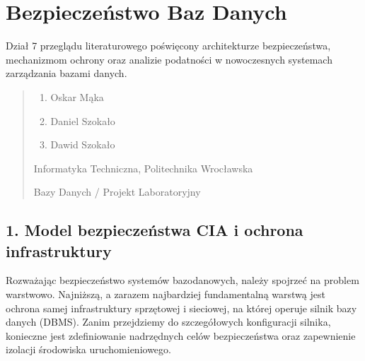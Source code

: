\documentclass[a4paper,11pt,english,openany,oneside]{sphinxmanual}
\begin{document}
\section{Bezpieczeństwo Baz Danych}
\label{\detokenize{rozdzial_2/rozdzial_27/index:bezpieczenstwo-baz-danych}}\label{\detokenize{rozdzial_2/rozdzial_27/index::doc}}
\sphinxAtStartPar
Dział 7 przeglądu literaturowego poświęcony architekturze bezpieczeństwa, mechanizmom ochrony oraz analizie podatności w nowoczesnych systemach zarządzania bazami danych.
\begin{quote}\begin{description}
\begin{enumerate}
%
\item {} 
\sphinxAtStartPar
Oskar Mąka

\item {} 
\sphinxAtStartPar
Daniel Szokało

\item {} 
\sphinxAtStartPar
Dawid Szokało

\end{enumerate}

\sphinxAtStartPar
Informatyka Techniczna, Politechnika Wrocławska

\sphinxAtStartPar
Bazy Danych / Projekt Laboratoryjny

\end{description}\end{quote}

\sphinxstepscope


\subsection{1. Model bezpieczeństwa CIA i ochrona infrastruktury}
\label{\detokenize{rozdzial_2/rozdzial_27/rozdzial_1:model-bezpieczenstwa-cia-i-ochrona-infrastruktury}}\label{\detokenize{rozdzial_2/rozdzial_27/rozdzial_1::doc}}
\sphinxAtStartPar
Rozważając bezpieczeństwo systemów bazodanowych, należy spojrzeć na problem warstwowo. Najniższą, a zarazem najbardziej fundamentalną warstwą jest ochrona samej infrastruktury sprzętowej i sieciowej, na której operuje silnik bazy danych (DBMS). Zanim przejdziemy do szczegółowych konfiguracji silnika, konieczne jest zdefiniowanie nadrzędnych celów bezpieczeństwa oraz zapewnienie izolacji środowiska uruchomieniowego.
\end{document}
